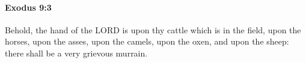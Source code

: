 
		\paragraph{Exodus 9:3} %
			\label{EXODUS-9-3}

			Behold, the hand of the LORD is upon thy cattle which is in the field, upon the horses, upon the asses, upon the camels, upon the oxen, and upon the sheep: there shall be a very grievous murrain.


